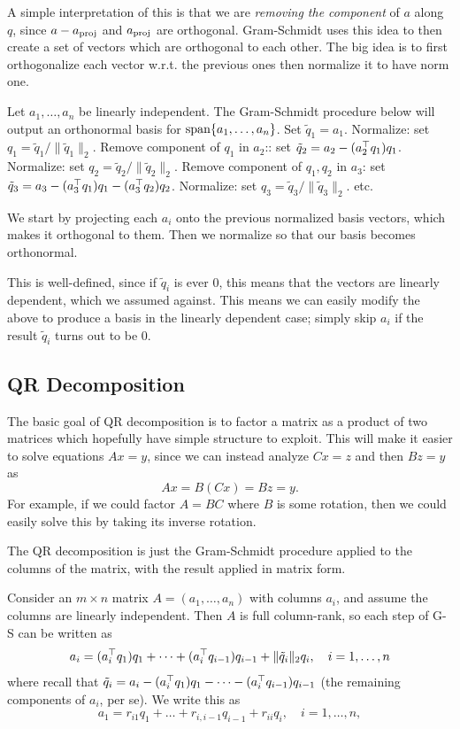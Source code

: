 \documentclass[11 pt]{scrartcl}
\begin{document}
A simple interpretation of this is that we are \emph{removing the component} of $a$ along $q$, since $a-a_{\text{proj}}$ and $a_{\text{proj}}$ are orthogonal. 
Gram-Schmidt uses this idea to then create a set of vectors which are orthogonal to each other. 
The big idea is to first orthogonalize each vector w.r.t. the previous ones then normalize it to have norm one. 

\begin{theorem}
    Let $a_1, \dots, a_n$ be linearly independent. 
    The Gram-Schmidt procedure below will output an orthonormal basis for $\text{span}\{a_1, \dots, a_n\}$. 
    \itemnum
        \ii Set $\tilde{q}_1 = a_1$. 
        \ii Normalize: set $q_1 = \tilde{q}_1/\|\tilde{q}_1\|_2.$
        \ii Remove component of $q_1$ in $a_2$:: set $\tilde{q}_2 = a_2 - (a_2^\top q_1) q_1$. 
        \ii Normalize: set $q_2 = \tilde{q}_2/\|\tilde{q}_2\|_2$. 
        \ii Remove component of $q_1, q_2$ in $a_3$: set $\tilde{q}_3 = a_3 - (a_3^\top q_1)q_1 - (a_3^\top q_2)q_2$. 
        \ii Normalize: set $q_3 = \tilde{q}_3/\|\tilde{q}_3\|_2$. 
        \ii etc.
    \itemend
\end{theorem}

We start by projecting each $a_i$ onto the previous normalized basis vectors, which makes it orthogonal to them. 
Then we normalize so that our basis becomes orthonormal.

This is well-defined, since if $\tilde{q}_i$ is ever 0, this means that the vectors are linearly dependent, which we assumed against. 
This means we can easily modify the above to produce a basis in the linearly dependent case; simply skip $a_i$ if the result $\tilde{q}_i$ turns out to be 0. 

\subsection{QR Decomposition}
The basic goal of QR decomposition is to factor a matrix as a product of two matrices which hopefully have simple structure to exploit. 
This will make it easier to solve equations $Ax = y$, since we can instead analyze $Cx = z$ and then $Bz = y$ as  
\[ Ax = B(Cx) = Bz = y.\] 
For example, if we could factor $A = BC$ where $B$ is some rotation, then we could easily solve this by taking its inverse rotation. 

The QR decomposition is just the Gram-Schmidt procedure applied to the columns of the matrix, with the result applied in matrix form. 

Consider an $m\times n$ matrix $A = (a_1, \dots, a_n)$ with columns $a_i$, and assume the columns are linearly independent. 
Then $A$ is full column-rank, so each step of G-S can be written as 
\[ a_i = (a_i^\top q_1) q_1 + \dots + (a_i^\top q_{i-1})q_{i-1} + \|\tilde{q}_i\|_2 q_i, \quad i=1,\dots, n\] 
where recall that $\tilde{q}_i = a_i - (a_i^\top q_1)q_1 - \dots - (a_i^\top q_{i-1})q_{i-1}$ (the remaining components of $a_i$, per se). 
We write this as 
\[ a_1 = r_{i1}q_1 + \dots + r_{i, i-1} q_{i-1} + r_{ii} q_i, \quad i = 1,\dots, n,\] 
\end{document}

